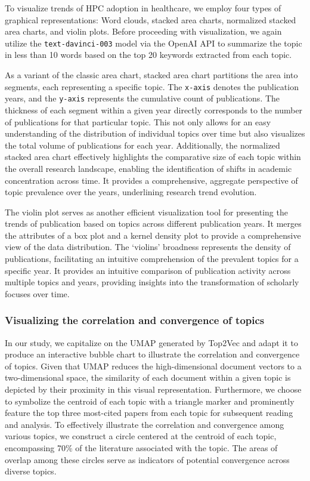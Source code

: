 To visualize trends of HPC adoption in healthcare, we employ four types of graphical representations: Word clouds, stacked area charts, normalized stacked area charts, and violin plots. Before proceeding with visualization, we again utilize the \texttt{text-davinci-003} model via the OpenAI API to summarize the topic in less than 10 words based on the top 20 keywords extracted from each topic.

As a variant of the classic area chart, stacked area chart partitions the area into segments, each representing a specific topic. The \texttt{x-axis} denotes the publication years, and the \texttt{y-axis} represents the cumulative count of publications. The thickness of each segment within a given year directly corresponds to the number of publications for that particular topic. This not only allows for an easy understanding of the distribution of individual topics over time but also visualizes the total volume of publications for each year. Additionally, the normalized stacked area chart effectively highlights the comparative size of each topic within the overall research landscape, enabling the identification of shifts in academic concentration across time. It provides a comprehensive, aggregate perspective of topic prevalence over the years, underlining research trend evolution.

The violin plot serves as another efficient visualization tool for presenting the trends of publication based on topics across different publication years. It merges the attributes of a box plot and a kernel density plot to provide a comprehensive view of the data distribution.  The `violins' broadness represents the density of publications, facilitating an intuitive comprehension of the prevalent topics for a specific year. It provides an intuitive comparison of publication activity across multiple topics and years, providing insights into the transformation of scholarly focuses over time.


\subsubsection{Visualizing the correlation and convergence of topics}\label{subsubse2.4.2}

In our study, we capitalize on the UMAP generated by Top2Vec and adapt it to produce an interactive bubble chart to illustrate the correlation and convergence of topics. Given that UMAP reduces the high-dimensional document vectors to a two-dimensional space, the similarity of each document within a given topic is depicted by their proximity in this visual representation. Furthermore, we choose to symbolize the centroid of each topic with a triangle marker and prominently feature the top three most-cited papers from each topic for subsequent reading and analysis. To effectively illustrate the correlation and convergence among various topics, we construct a circle centered at the centroid of each topic, encompassing 70\% of the literature associated with the topic. The areas of overlap among these circles serve as indicators of potential convergence across diverse topics.

